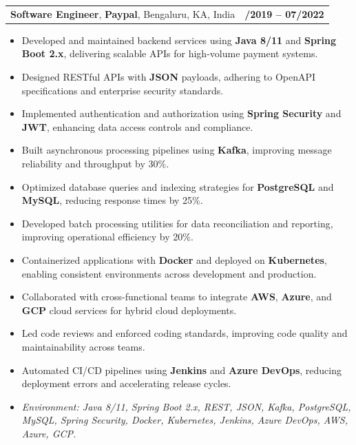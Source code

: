 \documentclass[letterpaper,11pt]{article}
\makeatletter
\newcommand{\resumeItem}[1]{
  \item\footnotesize{
    {#1 \vspace{-2pt}}
  }
}
\newcommand{\resumeSubheading}[4]{
  \vspace{-2pt}\item
    \begin{tabular*}{1.0\textwidth}[t]{l@{\extracolsep{\fill}}r}
      \textbf{\fontsize{10pt}{14pt}\selectfont #3}, \textbf{\fontsize{10pt}{14pt}\selectfont #1}, \fontsize{10pt}{14pt}\selectfont #4 & \textbf{\fontsize{10pt}{14pt}\selectfont #2} \\
    \end{tabular*}\vspace{-7pt}
}
\newcommand{\resumeItemListStart}{\begin{itemize}[leftmargin=*]}
\newcommand{\resumeItemListEnd}{\end{itemize}\vspace{-5pt}}
\makeatother
\begin{document}
\resumeSubheading
{Paypal}{08/2019 -- 07/2022}
{Software Engineer}{Bengaluru, KA, India}
\resumeItemListStart
  \resumeItem{Developed and maintained backend services using \textbf{Java 8/11} and \textbf{Spring Boot 2.x}, delivering scalable APIs for high-volume payment systems.}
  \resumeItem{Designed RESTful APIs with \textbf{JSON} payloads, adhering to OpenAPI specifications and enterprise security standards.}
  \resumeItem{Implemented authentication and authorization using \textbf{Spring Security} and \textbf{JWT}, enhancing data access controls and compliance.}
  \resumeItem{Built asynchronous processing pipelines using \textbf{Kafka}, improving message reliability and throughput by 30\%.}
  \resumeItem{Optimized database queries and indexing strategies for \textbf{PostgreSQL} and \textbf{MySQL}, reducing response times by 25\%.}
  \resumeItem{Developed batch processing utilities for data reconciliation and reporting, improving operational efficiency by 20\%.}
  \resumeItem{Containerized applications with \textbf{Docker} and deployed on \textbf{Kubernetes}, enabling consistent environments across development and production.}
  \resumeItem{Collaborated with cross-functional teams to integrate \textbf{AWS}, \textbf{Azure}, and \textbf{GCP} cloud services for hybrid cloud deployments.}
  \resumeItem{Led code reviews and enforced coding standards, improving code quality and maintainability across teams.}
  \resumeItem{Automated CI/CD pipelines using \textbf{Jenkins} and \textbf{Azure DevOps}, reducing deployment errors and accelerating release cycles.}
  \resumeItem{\textit{Environment: Java 8/11, Spring Boot 2.x, REST, JSON, Kafka, PostgreSQL, MySQL, Spring Security, Docker, Kubernetes, Jenkins, Azure DevOps, AWS, Azure, GCP.}}
\resumeItemListEnd
\end{document}
